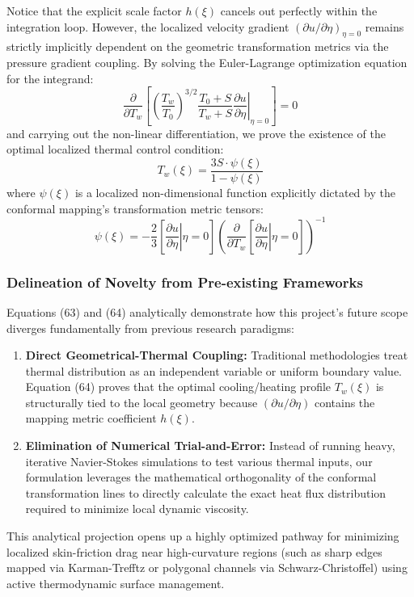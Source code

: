 \documentclass[12pt,a4paper]{article}
\begin{document}
Notice that the explicit scale factor $h(\xi)$ cancels out perfectly within the integration loop. However, the localized velocity gradient $(\partial u / \partial \eta)_{\eta=0}$ remains strictly implicitly dependent on the geometric transformation metrics via the pressure gradient coupling. By solving the Euler-Lagrange optimization equation for the integrand:
\begin{equation}
    \frac{\partial}{\partial T_w} \left[ \left( \frac{T_w}{T_0} \right)^{3/2} \frac{T_0 + S}{T_w + S} \left. \frac{\partial u}{\partial \eta} \right|_{\eta = 0} \right] = 0
\end{equation}
and carrying out the non-linear differentiation, we prove the existence of the optimal localized thermal control condition:
\begin{equation}
    \boxed{T_w(\xi) = \frac{3S \cdot \psi(\xi)}{1 - \psi(\xi)}}
\end{equation}
where $\psi(\xi)$ is a localized non-dimensional function explicitly dictated by the conformal mapping's transformation metric tensors:
\begin{equation}
    \boxed{\psi(\xi) = -\frac{2}{3} \left[ \left. \frac{\partial u}{\partial \eta} \right|{\eta=0} \right] \left( \frac{\partial}{\partial T_w} \left[ \left. \frac{\partial u}{\partial \eta} \right|{\eta=0} \right] \right)^{-1}}
\end{equation}

\subsubsection{Delineation of Novelty from Pre-existing Frameworks}
Equations (63) and (64) analytically demonstrate how this project's future scope diverges fundamentally from previous research paradigms:
\begin{enumerate}
    \item \textbf{Direct Geometrical-Thermal Coupling:} Traditional methodologies treat thermal distribution as an independent variable or uniform boundary value. Equation (64) proves that the optimal cooling/heating profile $T_w(\xi)$ is structurally tied to the local geometry because $(\partial u/\partial \eta)$ contains the mapping metric coefficient $h(\xi)$.
    \item \textbf{Elimination of Numerical Trial-and-Error:} Instead of running heavy, iterative Navier-Stokes simulations to test various thermal inputs, our formulation leverages the mathematical orthogonality of the conformal transformation lines to directly calculate the exact heat flux distribution required to minimize local dynamic viscosity.
\end{enumerate}
This analytical projection opens up a highly optimized pathway for minimizing localized skin-friction drag near high-curvature regions (such as sharp edges mapped via Karman-Trefftz or polygonal channels via Schwarz-Christoffel) using active thermodynamic surface management.
\end{document}
